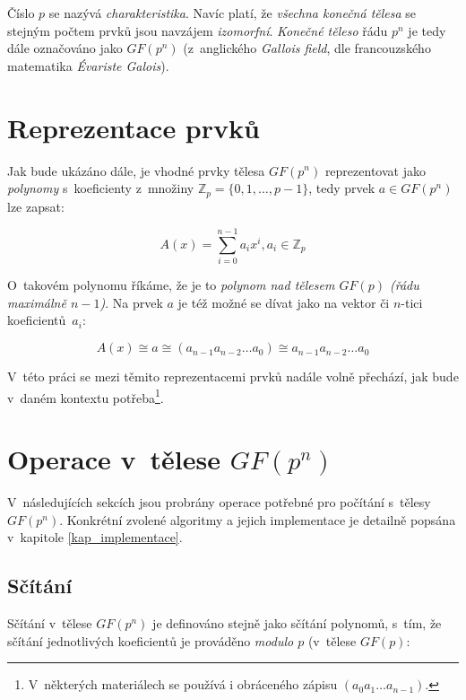 \documentclass[thesis=M,czech,hidelinks]{FITthesis}[2012/06/26]
\newcommand{\0}{{\textcolor[gray]{0.80}{0}}}
\begin{document}
Číslo $p$ se nazývá \emph{charakteristika}. Navíc platí, že \emph{všechna
konečná tělesa} se stejným počtem prvků jsou navzájem \emph{izomorfní}.
\emph{Konečné těleso} řádu $p^n$ je tedy dále označováno jako $GF(p^n)$
(z~anglického \emph{Gallois field}, dle francouzského matematika \emph{Évariste
Galois}).

\section{Reprezentace prvků}

Jak bude ukázáno dále, je vhodné prvky tělesa $GF(p^n)$ reprezentovat jako
\emph{polynomy} s~koeficienty z~množiny $\mathbb{Z}_p=\{0,1,\ldots,p-1\}$, tedy
prvek $a \in GF(p^n)$ lze zapsat:

$$ A(x) = \sum_{i=0}^{n-1} a_i x^i, a_i \in \mathbb{Z}_p $$

O~takovém polynomu říkáme, že je to \emph{polynom nad tělesem $GF(p)$ (řádu
maximálně $n-1$)}. Na prvek $a$ je též možné se dívat jako na vektor či $n$-tici
koeficientů~$a_i$:

$$
    A(x) \cong a \cong (a_{n-1} a_{n-2} \ldots a_0) \cong
    a_{n-1} a_{n-2} \ldots a_0
$$

V~této práci se mezi těmito reprezentacemi prvků nadále volně přechází, jak bude
v~daném kontextu potřeba\footnote{
    V~některých materiálech se používá i obráceného zápisu
    $(a_0 a_1 \ldots a_{n-1})$.
}.

\section{Operace v~tělese $GF(p^n)$}

V~následujících sekcích jsou probrány operace potřebné pro počítání s~tělesy
$GF(p^n)$. Konkrétní zvolené algoritmy a jejich implementace je detailně popsána
v~kapitole \ref{kap_implementace}.

\subsection{Sčítání}

Sčítání v~tělese $GF(p^n)$ je definováno stejně jako sčítání polynomů, s~tím, že
sčítání jednotlivých koeficientů je prováděno \emph{modulo $p$} (v~tělese
$GF(p)$:
\end{document}

